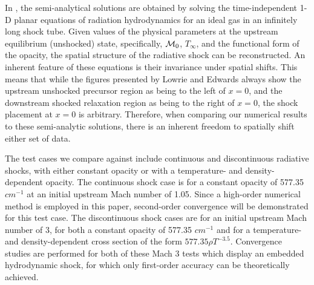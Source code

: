 \documentclass[times,doublespace]{fldauth}%
\begin{document}
In \cite{LowrieEdwards}, the semi-analytical solutions are obtained by solving the time-independent 1-D planar equations of radiation hydrodynamics for an ideal gas in an infinitely long shock tube.
Given values of the physical parameters at the upstream equilibrium (unshocked) state, specifically, ${\cal M}_0$, $T_{\infty}$, and the functional form of the opacity, the spatial structure of the radiative shock can be reconstructed.
An inherent feature of these equations is their invariance under spatial shifts.
This means that while the figures presented by Lowrie and Edwards \cite{LowrieEdwards} always show the upstream unshocked precursor region as being to the left of $x = 0$, and the downstream shocked relaxation region as being to the right of $x = 0$, the shock placement at $x = 0$ is arbitrary.
Therefore, when comparing our numerical results to these semi-analytic solutions, there is an inherent freedom to spatially shift either set of data.

The test cases we compare against include continuous and discontinuous radiative shocks, with either constant opacity or with a temperature- and density-dependent opacity.
The continuous shock case is for a constant opacity of 577.35 $cm^{-1}$ at an initial upstream Mach number of 1.05.
Since a high-order numerical method is employed in this paper, second-order convergence will be demonstrated for this test case.
The discontinuous shock cases are for an initial upstream Mach number of 3, for both a constant opacity of 577.35 $cm^{-1}$ and for a temperature- and density-dependent cross section of the form $577.35 \rho T^{-3.5}$.
Convergence studies are performed for both of these Mach 3 tests which display an embedded hydrodynamic shock, for which only first-order accuracy can be theoretically achieved.
\end{document}
